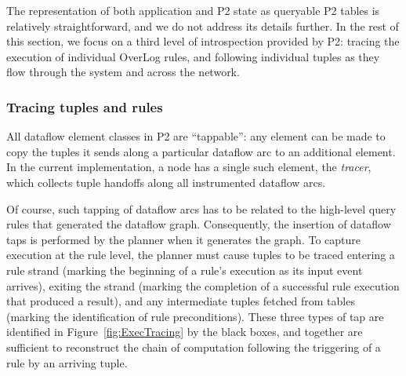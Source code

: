 \documentclass{sig-alt-full}
\def\Sys{P2\xspace}
\def\Lang{OverLog\xspace}
\begin{document}
The representation of both application and \Sys state as
queryable \Sys tables is relatively straightforward, 
and we do not address its details further.  In the rest of
this section, we focus on a third level of introspection provided by
\Sys: tracing the execution of individual \Lang rules, and following
individual tuples as they flow through the system and across the network.  


\subsubsection{Tracing tuples and rules}
\label{sec:tracing}
All dataflow element classes in \Sys are ``tappable'': any element can
be made to copy the tuples it sends along a particular dataflow arc to
an additional element.   In the current implementation, a node has a
single such element, the \textit{tracer}, which collects 
tuple handoffs along all instrumented dataflow arcs. 

Of course, such tapping of dataflow arcs has to be related to the
high-level query rules that generated the dataflow graph.
Consequently, the insertion of dataflow taps is performed by the
planner when it generates the graph.  
To capture execution at the rule level, the
planner must cause tuples to be traced entering a rule strand
(marking the beginning of a rule's execution as its input event
arrives), exiting the strand (marking the completion of a
successful rule execution that produced a result), and any
intermediate tuples fetched from tables
(marking the identification of rule preconditions). 
These three types of tap are identified in
Figure~\ref{fig:ExecTracing} by the black boxes, and together are
sufficient to reconstruct the chain of computation 
following the triggering of a rule by an arriving tuple.  
\end{document}
